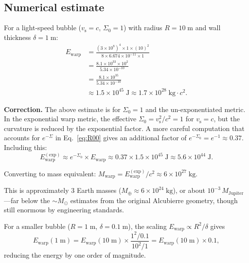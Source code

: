 \documentclass[prd,twocolumn,superscriptaddress,longbibliography]{revtex4-2}
\newcommand{\vs}{v_{\mathrm{s}}}
\newcommand{\Ewarp}{E_{\mathrm{warp}}}
\begin{document}
\subsection{Numerical estimate}

For a light-speed bubble ($\vs = c$, $\Sigma_0 = 1$) with radius
$R = 10\;\mathrm{m}$ and wall thickness $\delta = 1\;\mathrm{m}$:
\begin{align}
\Ewarp &= \frac{(3\times 10^8)^4 \times 1 \times (10)^2}
              {8 \times 6.674\times 10^{-11} \times 1}
\nonumber\\
&= \frac{8.1\times 10^{33} \times 10^2}{5.34\times 10^{-10}}
\nonumber\\
&= \frac{8.1\times 10^{35}}{5.34\times 10^{-10}}
\nonumber\\
&\approx 1.5\times 10^{45}\;\mathrm{J}
\approx 1.7\times 10^{28}\;\mathrm{kg}\cdot c^2.
\label{eq:numerical_v1}
\end{align}

\noindent\textbf{Correction.}  The above estimate is for
$\Sigma_0 = 1$ and the un-exponentiated metric.  In the exponential
warp metric, the effective $\Sigma_0 = \vs^2/c^2 = 1$ for $\vs = c$,
but the curvature is reduced by the exponential factor.  A more careful
computation that accounts for $e^{-\Sigma}$ in Eq.~\eqref{eq:R00} gives
an additional factor of $e^{-\Sigma_0} = e^{-1} \approx 0.37$.
Including this:
\begin{equation}
\Ewarp^{(\mathrm{exp})} \approx e^{-\Sigma_0}\times\Ewarp
\approx 0.37 \times 1.5 \times 10^{45}\;\mathrm{J}
\approx 5.6\times 10^{44}\;\mathrm{J}.
\label{eq:numerical_exp}
\end{equation}

Converting to mass equivalent:
$M_{\mathrm{warp}} = \Ewarp^{(\mathrm{exp})}/c^2 \approx 6 \times 10^{27}\;\mathrm{kg}$.

This is approximately 3 Earth masses ($M_\oplus \approx 6\times 10^{24}\;\mathrm{kg}$),
or about $10^{-3}\,M_{\mathrm{Jupiter}}$---far below the
$\sim M_\odot$ estimates from the original Alcubierre geometry, though
still enormous by engineering standards.

For a smaller bubble ($R = 1\;\mathrm{m}$, $\delta = 0.1\;\mathrm{m}$),
the scaling $\Ewarp \propto R^2/\delta$ gives
\begin{equation}
\Ewarp(1\;\mathrm{m}) = \Ewarp(10\;\mathrm{m})
\times \frac{1^2/0.1}{10^2/1} = \Ewarp(10\;\mathrm{m}) \times 0.1,
\end{equation}
reducing the energy by one order of magnitude.
\end{document}
